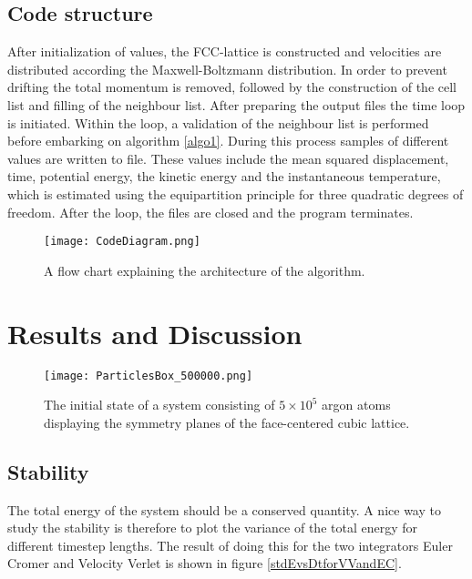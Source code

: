 \documentclass[twoside,utf8]{article}
\begin{document}
\begin{multicols}{2}
\subsection{Code structure}

After initialization of values, the FCC-lattice is constructed and velocities are distributed according the Maxwell-Boltzmann distribution. In order to prevent drifting the total momentum is removed, followed by the construction of the cell list and filling of the neighbour list. After preparing the output files the time loop is initiated. Within the loop, a validation of the neighbour list is performed before embarking on algorithm \ref*{algo1}. During this process samples of different values are written to file. These values include the mean squared displacement, time, potential energy, the kinetic energy and the instantaneous temperature, which is estimated using the equipartition principle for three quadratic degrees of freedom. After the loop, the files are closed and the program terminates.

\begin{figure}[H]
\begin{center}
\texttt{[image: CodeDiagram.png]}
\end{center}
\caption{
A flow chart explaining the architecture of the algorithm.
}
\end{figure}


\section{Results and Discussion}

\begin{figure}[H]
\begin{center}
\texttt{[image: ParticlesBox\_500000.png]}
\end{center}
\caption{
The initial state of a system consisting of $5\times 10^{5}$ argon atoms displaying the symmetry planes of the face-centered cubic lattice. 
}
\label{initialHugeEnsamble}
\end{figure}


\subsection{Stability}

The total energy of the system should be a conserved quantity. A nice way to study the stability is therefore to plot the variance of the total energy for different timestep lengths. The result of doing this for the two integrators Euler Cromer and Velocity Verlet is shown in figure \ref*{stdEvsDtforVVandEC}. 



\end{multicols}
\end{document}
